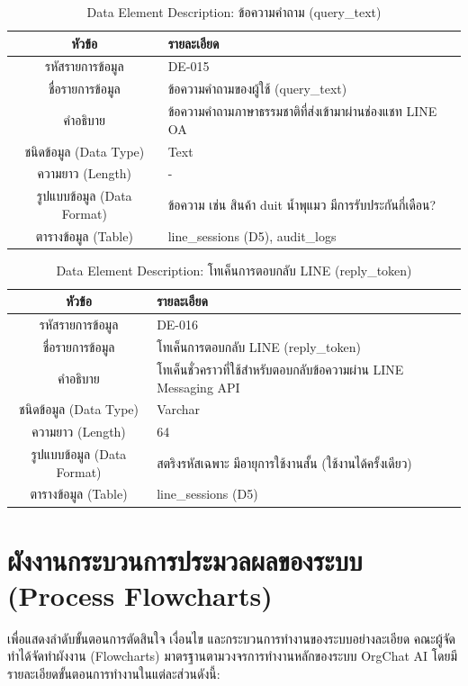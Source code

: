 \begin{table}[htbp]
\centering
\caption{Data Element Description: ข้อความคำถาม (query\_text)}
\label{tab3:de_query}
\begin{tabularx}{\textwidth}{| c | L |}
\hline
\textbf{หัวข้อ} & \textbf{รายละเอียด} \\ \hline
รหัสรายการข้อมูล & DE-015 \\ \hline
ชื่อรายการข้อมูล & ข้อความคำถามของผู้ใช้ (query\_text) \\ \hline
คำอธิบาย & ข้อความคำถามภาษาธรรมชาติที่ส่งเข้ามาผ่านช่องแชท LINE OA \\ \hline
ชนิดข้อมูล (Data Type) & Text \\ \hline
ความยาว (Length) & - \\ \hline
รูปแบบข้อมูล (Data Format) & ข้อความ เช่น สินค้า duit น้ำพุแมว มีการรับประกันกี่เดือน? \\ \hline
ตารางข้อมูล (Table) & line\_sessions (D5), audit\_logs \\ \hline
\end{tabularx}
\end{table}

\begin{table}[htbp]
\centering
\caption{Data Element Description: โทเค็นการตอบกลับ LINE (reply\_token)}
\label{tab3:de_reply_token}
\begin{tabularx}{\textwidth}{| c | L |}
\hline
\textbf{หัวข้อ} & \textbf{รายละเอียด} \\ \hline
รหัสรายการข้อมูล & DE-016 \\ \hline
ชื่อรายการข้อมูล & โทเค็นการตอบกลับ LINE (reply\_token) \\ \hline
คำอธิบาย & โทเค็นชั่วคราวที่ใช้สำหรับตอบกลับข้อความผ่าน LINE Messaging API \\ \hline
ชนิดข้อมูล (Data Type) & Varchar \\ \hline
ความยาว (Length) & 64 \\ \hline
รูปแบบข้อมูล (Data Format) & สตริงรหัสเฉพาะ มีอายุการใช้งานสั้น (ใช้งานได้ครั้งเดียว) \\ \hline
ตารางข้อมูล (Table) & line\_sessions (D5) \\ \hline
\end{tabularx}
\end{table}


\clearpage
\section{ผังงานกระบวนการประมวลผลของระบบ (Process Flowcharts)}
\hspace*{1.3em}
เพื่อแสดงลำดับขั้นตอนการตัดสินใจ เงื่อนไข และกระบวนการทำงานของระบบอย่างละเอียด คณะผู้จัดทำได้จัดทำผังงาน (Flowcharts) มาตรฐานตามวงจรการทำงานหลักของระบบ OrgChat AI โดยมีรายละเอียดขั้นตอนการทำงานในแต่ละส่วนดังนี้:

